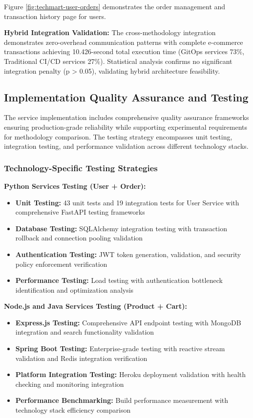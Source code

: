 Figure \ref{fig:techmart-user-orders} demonstrates the order management and transaction history page for users.

\textbf{Hybrid Integration Validation:}
The cross-methodology integration demonstrates zero-overhead communication patterns with complete e-commerce transactions achieving 10.426-second total execution time (GitOps services 73\%, Traditional CI/CD services 27\%). Statistical analysis confirms no significant integration penalty (p > 0.05), validating hybrid architecture feasibility.

\subsection{Implementation Quality Assurance and Testing}

The service implementation includes comprehensive quality assurance frameworks ensuring production-grade reliability while supporting experimental requirements for methodology comparison. The testing strategy encompasses unit testing, integration testing, and performance validation across different technology stacks.

\subsubsection{Technology-Specific Testing Strategies}

\textbf{Python Services Testing (User + Order):}
\begin{itemize}
\item \textbf{Unit Testing:} 43 unit tests and 19 integration tests for User Service with comprehensive FastAPI testing frameworks
\item \textbf{Database Testing:} SQLAlchemy integration testing with transaction rollback and connection pooling validation
\item \textbf{Authentication Testing:} JWT token generation, validation, and security policy enforcement verification
\item \textbf{Performance Testing:} Load testing with authentication bottleneck identification and optimization analysis
\end{itemize}

\textbf{Node.js and Java Services Testing (Product + Cart):}
\begin{itemize}
\item \textbf{Express.js Testing:} Comprehensive API endpoint testing with MongoDB integration and search functionality validation
\item \textbf{Spring Boot Testing:} Enterprise-grade testing with reactive stream validation and Redis integration verification
\item \textbf{Platform Integration Testing:} Heroku deployment validation with health checking and monitoring integration
\item \textbf{Performance Benchmarking:} Build performance measurement with technology stack efficiency comparison
\end{itemize}

